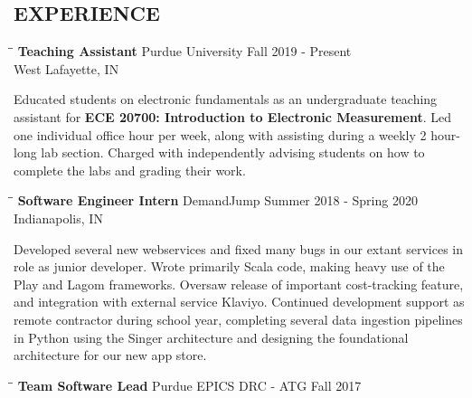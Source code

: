 \documentclass[10pt]{res}
\begin{document}
\begin{resume}
\vspace{-20pt}\section{EXPERIENCE}
   \vspace{-0.1in}	
	\begin{tabbing}
   \hspace{2.3in}\= \hspace{2.6in}\= \kill %
    {\bf Teaching Assistant} \>Purdue University \>Fall 2019 - Present \\
                             \>West Lafayette, IN
   \end{tabbing}\vspace{-20pt}      %
	Educated students on electronic fundamentals as an undergraduate teaching assistant for \textbf{ECE 20700: Introduction to Electronic Measurement}.
	Led one individual office hour per week, along with assisting during a weekly 2 hour-long lab section.
	Charged with independently advising students on how to complete the labs and grading their
	work.
	\vspace{-10pt}\begin{tabbing}
   \hspace{2.3in}\= \hspace{2.6in}\= \kill %
    {\bf Software Engineer Intern} \>DemandJump \>Summer 2018 - Spring 2020 \\
                             \>Indianapolis, IN
   \end{tabbing}\vspace{-20pt}      %
  Developed several new webservices and fixed many bugs in our extant services in role as junior
  developer. Wrote primarily Scala code, making heavy use of the Play and Lagom frameworks. Oversaw release of important cost-tracking feature, and integration with external service
  Klaviyo. Continued development support as remote contractor during school year, completing several
	data ingestion pipelines in Python using the Singer architecture and designing the foundational architecture
	for our new app store.
	\vspace{-10pt}\begin{tabbing}
   \hspace{2.3in}\= \hspace{2.6in}\= \kill %
    {\bf Team Software Lead} \>Purdue EPICS DRC - ATG \>Fall 2017 \\

\end{tabbing}
\end{resume}
\end{document}
